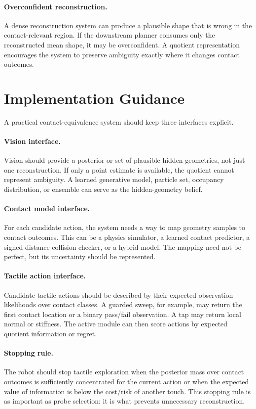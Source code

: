 \documentclass{article}
\begin{document}
\paragraph{Overconfident reconstruction.}
A dense reconstruction system can produce a plausible shape that is wrong in the contact-relevant region. If the downstream planner consumes only the reconstructed mean shape, it may be overconfident. A quotient representation encourages the system to preserve ambiguity exactly where it changes contact outcomes.

\section{Implementation Guidance}

A practical contact-equivalence system should keep three interfaces explicit.

\paragraph{Vision interface.}
Vision should provide a posterior or set of plausible hidden geometries, not just one reconstruction. If only a point estimate is available, the quotient cannot represent ambiguity. A learned generative model, particle set, occupancy distribution, or ensemble can serve as the hidden-geometry belief.

\paragraph{Contact model interface.}
For each candidate action, the system needs a way to map geometry samples to contact outcomes. This can be a physics simulator, a learned contact predictor, a signed-distance collision checker, or a hybrid model. The mapping need not be perfect, but its uncertainty should be represented.

\paragraph{Tactile action interface.}
Candidate tactile actions should be described by their expected observation likelihoods over contact classes. A guarded sweep, for example, may return the first contact location or a binary pass/fail observation. A tap may return local normal or stiffness. The active module can then score actions by expected quotient information or regret.

\paragraph{Stopping rule.}
The robot should stop tactile exploration when the posterior mass over contact outcomes is sufficiently concentrated for the current action or when the expected value of information is below the cost/risk of another touch. This stopping rule is as important as probe selection: it is what prevents unnecessary reconstruction.
\end{document}
